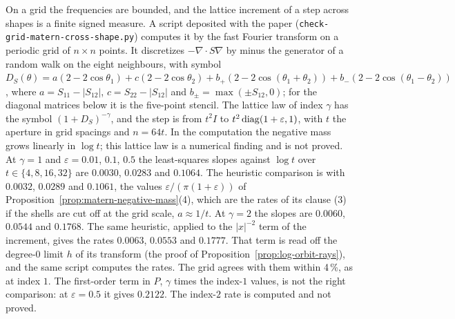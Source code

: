 \begin{remark}\label{rem:matern-grid}
On a grid the frequencies are bounded, and the lattice increment of a step across shapes is a finite
signed measure. A script deposited with the paper (\texttt{check-grid-matern-cross-shape.py}) computes it by the fast
Fourier transform on a periodic grid of $n \times n$ points. It discretizes $-\nabla\cdot S\nabla$ by minus the
generator of a random walk on the eight neighbours, with symbol
$D_S(\theta) = a(2 - 2\cos\theta_1) + c(2 - 2\cos\theta_2) + b_+(2 - 2\cos(\theta_1 + \theta_2)) +
b_-(2 - 2\cos(\theta_1 - \theta_2))$, where $a = S_{11} - |S_{12}|$, $c = S_{22} - |S_{12}|$ and
$b_\pm = \max(\pm S_{12}, 0)$; for the diagonal matrices below it is the five-point stencil. The
lattice \Matern{} law of index $\gamma$ has the symbol $(1 + D_S)^{-\gamma}$, and the step is from
$t^2I$ to $t^2\operatorname{diag}(1+\varepsilon, 1)$, with $t$ the aperture in grid spacings and $n = 64t$. In the computation the negative
mass grows linearly in $\log t$; this lattice law is a numerical finding and is not proved. At
$\gamma = 1$ and $\varepsilon = 0.01$, $0.1$, $0.5$ the least-squares slopes against $\log t$ over
$t \in \{4, 8, 16, 32\}$ are
$0.0030$, $0.0283$ and $0.1064$. The heuristic comparison is with $0.0032$, $0.0289$ and $0.1061$, the
values $\varepsilon/(\pi(1+\varepsilon))$ of Proposition~\ref{prop:matern-negative-mass}(4), which are
the rates of its clause (3) if the shells are cut off at the grid scale, $a \approx 1/t$. At
$\gamma = 2$ the slopes are $0.0060$, $0.0544$ and $0.1768$. The same heuristic, applied to the
$|x|^{-2}$ term of the increment, gives the rates $0.0063$, $0.0553$ and $0.1777$. That term is read off
the degree-$0$ limit $h$ of its transform (the proof of Proposition~\ref{prop:log-orbit-rays}), and the
same script computes the rates. The grid
agrees with them within 4\,\%, as at index $1$. The first-order term in $P$, $\gamma$ times the index-$1$
values, is not the right comparison: at $\varepsilon = 0.5$ it gives $0.2122$. The index-$2$ rate is
computed and not proved.
\end{remark}
